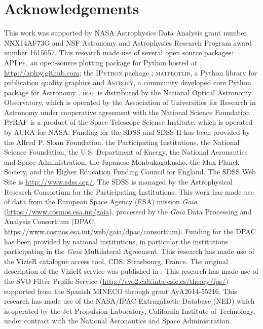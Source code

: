 \documentclass[apj, revtex4-1]{emulateapj}
\begin{document}
\section*{Acknowledgements}
This work was supported by NASA Astrophysics Data Analysis grant number NNX14AF73G and NSF Astronomy and Astrophysics Research Program award number 1615657. This research made use of several open source packages: \textsc{APLpy}, an open-source plotting package for Python hosted at \url{http://aplpy.github.com}; the \textsc{IPython} package \citep{Perez2007}; \textsc{matplotlib}, a Python library for publication quality graphics \citep{Hunter2007} and \textsc{Astropy}, a community developed core Python package for Astronomy \citep{TheAstropyCollaboration2013}.
\textsc{iraf} is distributed by the National Optical Astronomy Observatory, which is operated by the Association of Universities for Research in Astronomy under cooperative agreement with the National Science Foundation \citep{Tody1993}.
\textsc{PyRAF} is a product of the Space Telescope Science Institute, which is operated by AURA for NASA.
Funding for the SDSS and SDSS-II has been provided by the Alfred P. Sloan Foundation, the Participating Institutions, the National Science Foundation, the U.S. Department of Energy, the National Aeronautics and Space Administration, the Japanese Monbukagakusho, the Max Planck Society, and the Higher Education Funding Council for England. The SDSS Web Site is \url{http://www.sdss.org/}. The SDSS is managed by the Astrophysical Research Consortium for the Participating Institutions.
This work has made use of data from the European Space Agency (ESA) mission \textit{Gaia} (\url{https://www.cosmos.esa.int/gaia}), processed by the \textit{Gaia} Data Processing and Analysis Consortium (DPAC, \url{https://www.cosmos.esa.int/web/gaia/dpac/consortium}). Funding for the DPAC has been provided by national institutions, in particular the institutions participating in the \textit{Gaia} Multilateral Agreement.
This research has made use of the VizieR catalogue access tool, CDS, Strasbourg, France. The original description of the VizieR service was published in \cite{Ochsenbein2000}.
This research has made use of the SVO Filter Profile Service (\url{http://svo2.cab.inta-csic.es/theory/fps/}) supported from the Spanish MINECO through grant AyA2014-55216.
This research has made use of the NASA/IPAC Extragalactic Database (NED) which is operated by the Jet Propulsion Laboratory, California Institute of Technology, under contract with the National Aeronautics and Space Administration.




\end{document}
